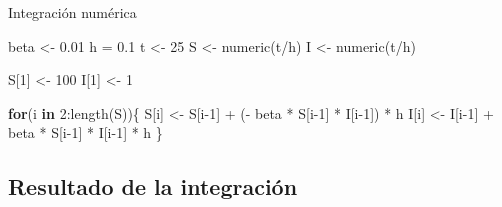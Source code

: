 \documentclass[
  11pt,
  ignorenonframetext,
]{beamer}
\newenvironment{Shaded}{}{}
\newcommand{\ControlFlowTok}[1]{\textcolor[rgb]{0.00,0.44,0.13}{\textbf{#1}}}
\newcommand{\DecValTok}[1]{\textcolor[rgb]{0.25,0.63,0.44}{#1}}
\newcommand{\FloatTok}[1]{\textcolor[rgb]{0.25,0.63,0.44}{#1}}
\newcommand{\FunctionTok}[1]{\textcolor[rgb]{0.02,0.16,0.49}{#1}}
\newcommand{\NormalTok}[1]{#1}
\newcommand{\OtherTok}[1]{\textcolor[rgb]{0.00,0.44,0.13}{#1}}
\newcommand{\SpecialCharTok}[1]{\textcolor[rgb]{0.25,0.44,0.63}{#1}}
\begin{document}
\begin{frame}[fragile]{Integración numérica}
\begin{Shaded}
\begin{Highlighting}[]
\NormalTok{beta }\OtherTok{\textless{}{-}} \FloatTok{0.01}
\NormalTok{h }\OtherTok{=} \FloatTok{0.1}
\NormalTok{t }\OtherTok{\textless{}{-}} \DecValTok{25}
\NormalTok{S }\OtherTok{\textless{}{-}} \FunctionTok{numeric}\NormalTok{(t}\SpecialCharTok{/}\NormalTok{h)}
\NormalTok{I }\OtherTok{\textless{}{-}} \FunctionTok{numeric}\NormalTok{(t}\SpecialCharTok{/}\NormalTok{h)}

\NormalTok{S[}\DecValTok{1}\NormalTok{] }\OtherTok{\textless{}{-}} \DecValTok{100}
\NormalTok{I[}\DecValTok{1}\NormalTok{] }\OtherTok{\textless{}{-}} \DecValTok{1}

\ControlFlowTok{for}\NormalTok{(i }\ControlFlowTok{in} \DecValTok{2}\SpecialCharTok{:}\FunctionTok{length}\NormalTok{(S))\{}
\NormalTok{  S[i] }\OtherTok{\textless{}{-}}\NormalTok{ S[i}\DecValTok{{-}1}\NormalTok{] }\SpecialCharTok{+}\NormalTok{ (}\SpecialCharTok{{-}}\NormalTok{ beta }\SpecialCharTok{*}\NormalTok{ S[i}\DecValTok{{-}1}\NormalTok{] }\SpecialCharTok{*}\NormalTok{ I[i}\DecValTok{{-}1}\NormalTok{]) }\SpecialCharTok{*}\NormalTok{ h}
\NormalTok{  I[i] }\OtherTok{\textless{}{-}}\NormalTok{ I[i}\DecValTok{{-}1}\NormalTok{] }\SpecialCharTok{+}\NormalTok{ beta }\SpecialCharTok{*}\NormalTok{ S[i}\DecValTok{{-}1}\NormalTok{] }\SpecialCharTok{*}\NormalTok{ I[i}\DecValTok{{-}1}\NormalTok{] }\SpecialCharTok{*}\NormalTok{ h}
\NormalTok{\}}
\end{Highlighting}
\end{Shaded}
\end{frame}

\hypertarget{resultado-de-la-integraciuxf3n}{%
\subsection{Resultado de la
integración}\label{resultado-de-la-integraciuxf3n}}
\end{document}

